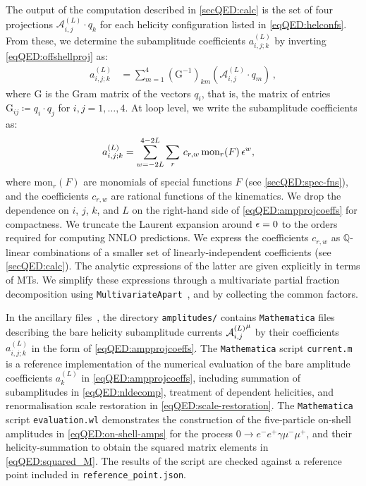 \documentclass[main.tex]{subfiles}
\begin{document}
The output of the computation described in \cref{secQED:calc} is the set of four projections $\mathcal{A}^{(L)}_{i,j} \cdot q_k$ for each helicity configuration listed in \cref{eqQED:helconfs}.
From these, we determine the subamplitude coefficients $a_{i,j;k}^{(L)}$ by inverting \cref{eqQED:offshellproj} as:
\begin{align}
    \label{eqQED:ampcoeffinv}
    a_{i,j ; k}^{(L)} &= \sum_{m=1}^4 \left(\mathrm{G}^{-1}\right)_{km} \left(\mathcal{A}^{(L)}_{i,j} \cdot q_m\right) \,,
\end{align}
where $\mathrm{G}$ is the Gram matrix of the vectors $q_i$, that is, the matrix of entries $\mathrm{G}_{ij} \coloneqq q_i \cdot q_j$ for $i,j=1,\ldots,4$.
At loop level, we write the subamplitude coefficients as:
\begin{align}
    \label{eqQED:ampprojcoeffs}
    a_{i,j;k}^{(L)} &= \sum_{w=-2L}^{4-2L} \sum_r\,c_{r,w}\,\text{mon}_r(F)\,\epsilon^w ,
\end{align}
where $\text{mon}_r(F)$ are monomials of special functions $F$ (see \cref{secQED:spec-fns}), and the coefficients $c_{r,w}$ are rational functions of the kinematics. 
We drop the dependence on $i$, $j$, $k$, and $L$ on the right-hand side of \cref{eqQED:ampprojcoeffs} for compactness. 
We truncate the Laurent expansion around $\epsilon=0$ to the orders required for computing NNLO predictions.
We express the coefficients $c_{r,w}$ as $\mathbb{Q}$-linear combinations of a smaller set of linearly-independent coefficients (see \cref{secQED:calc}).
The analytic expressions of the latter are given explicitly in terms of MTs.
We simplify these expressions through a multivariate partial fraction decomposition using \texttt{MultivariateApart}~\cite{Heller:2021qkz}, and by collecting the common factors.

In the ancillary files~\cite{zenodo}, the directory \texttt{amplitudes/} contains \texttt{Mathematica} files describing the bare helicity subamplitude currents ${\mathcal{A}^{(L)}_{i, j}}^{\mu}$ by their coefficients $a_{i,j;k}^{(L)}$ in the form of \cref{eqQED:ampprojcoeffs}.
The \texttt{Mathematica} script \texttt{current.m} is a reference implementation of the numerical evaluation of the bare amplitude coefficients $a_k^{(L)}$ in \cref{eqQED:ampprojcoeffs}, including summation of subamplitudes in \cref{eqQED:nldecomp}, treatment of dependent helicities, and renormalisation scale restoration in \cref{eqQED:scale-restoration}.
The \texttt{Mathematica} script \texttt{evaluation.wl} demonstrates the construction of the five-particle on-shell amplitudes in \cref{eqQED:on-shell-amps} for the process $0\to e^- e^+ \gamma \mu^- \mu^+$, and their helicity-summation to obtain the squared matrix elements in \cref{eqQED:squared_M}.
The results of the script are checked against a reference point included in \texttt{reference\_point.json}.
\end{document}
